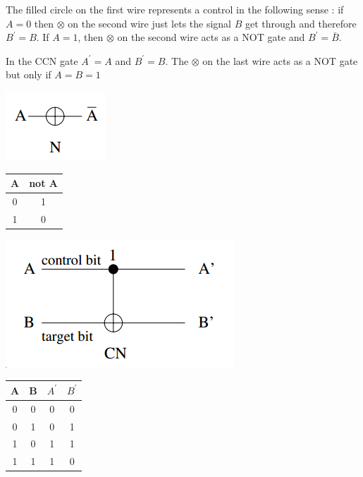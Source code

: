 \documentclass[12pt]{book}
\begin{document}
The filled circle on the first wire represents a control in the following sense : if $A = 0$ then $ \otimes $ on the second wire just lets the signal $B$ get through and therefore $ B^{\prime} = B $.
If $A = 1$, then $ \otimes $ 
on the second wire acts as a NOT gate and
$B^{\prime} = \bar{B}$.

In the CCN gate $A^{\prime} = A$ and $B^{\prime} = B$. 
The $ \otimes $ on the last wire acts as a NOT gate but only if $A = B = 1$

\newpage

\begin{center}
	\includegraphics[scale=1]{./reversible.png}
\end{center}

\begin{center}
  \begin{tabular}{ | c | c | }
    \hline
    A  & not A \\ \hline
    0 & 1 \\ \hline
    1 & 0 \\
    \hline
  \end{tabular}
\end{center}


\begin{center}
	\includegraphics[scale=1]{./reversible_2.png}
\end{center}


\begin{center}
  \begin{tabular}{ | c | c | c | c | }
  \hline
    A & B & $A^{\prime}$ & $B^{\prime}$ \\ \hline
    0 & 0 & 0 & 0 \\ \hline
    0 & 1 & 0 & 1 \\ \hline
    1 & 0 & 1 & 1 \\ \hline
    1 & 1 & 1 & 0 \\
    \hline
  \end{tabular}
\end{center}
\end{document}
